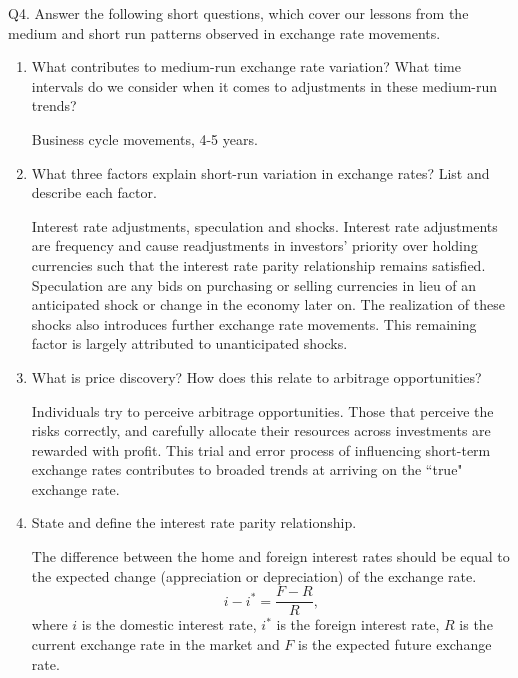 \documentclass[12pt]{article}
\begin{document}
	\newpage

\noindent Q4. Answer the following short questions, which cover our lessons from the medium and short run patterns observed in exchange rate movements.

\begin{enumerate}[1)]
\item What contributes to medium-run exchange rate variation? What time intervals do we consider when it comes to adjustments in these medium-run trends?

\vspace{0.2in}
Business cycle movements, 4-5 years.
\vspace{0.2in}

\item What three factors explain short-run variation in exchange rates? List and describe each factor.

\vspace{0.2in}
Interest rate adjustments, speculation and shocks. Interest rate adjustments are frequency and cause readjustments in investors' priority over holding currencies such that the interest rate parity relationship remains satisfied.
Speculation are any bids on purchasing or selling currencies in lieu of an anticipated shock or change in the economy later on.
The realization of these shocks also introduces further exchange rate movements. This remaining factor is largely attributed to unanticipated shocks.
\vspace{0.2in}

\item What is price discovery? How does this relate to arbitrage opportunities?

\vspace{0.2in}
Individuals try to perceive arbitrage opportunities. Those that perceive the risks correctly, and carefully allocate their resources across investments are rewarded with profit. 
This trial and error process of influencing short-term exchange rates contributes to broaded trends at arriving on the ``true" exchange rate. 
\vspace{0.2in}

	\newpage

\item State and define the interest rate parity relationship.

\vspace{0.2in}
The difference between the home and foreign interest rates should be equal to the expected change (appreciation or depreciation) of the exchange rate.
$$i-i^* = \frac{F-R}{R},$$
where $i$ is the domestic interest rate, $i^*$ is the foreign interest rate, $R$ is the current exchange rate in the market and $F$ is the expected future exchange rate. 
\vspace{0.2in}


\end{enumerate}
\end{document}

